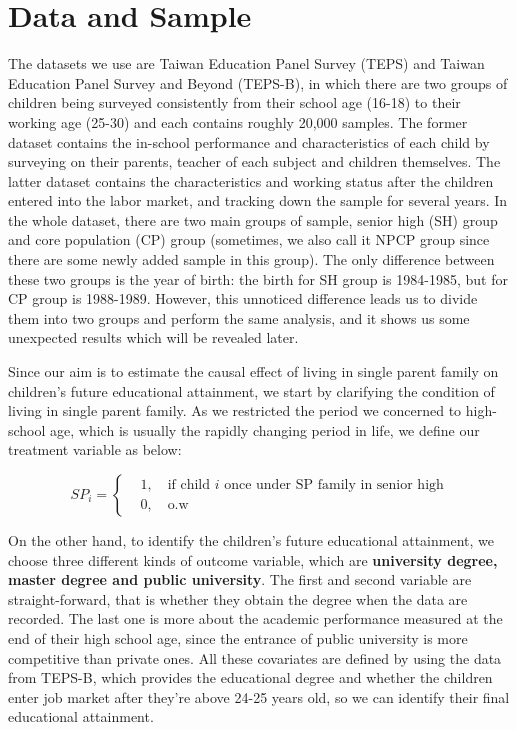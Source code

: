 \documentclass[]{AEA}
\begin{document}
\section{Data and Sample} %

    The datasets we use are Taiwan Education Panel Survey (TEPS) and Taiwan Education Panel Survey and Beyond (TEPS-B), in which there are two groups of children being surveyed consistently from their school age (16-18) to their working age (25-30) and each contains roughly 20,000 samples. The former dataset contains the in-school performance and characteristics of each child by surveying on their parents, teacher of each subject and children themselves. The latter dataset contains the characteristics and working status after the children entered into the labor market, and tracking down the sample for several years.  In the whole dataset, there are two main groups of sample, senior high (SH) group and core population (CP) group (sometimes, we also call it NPCP group since there are some newly added sample in this group).  The only difference between these two groups is the year of birth: the birth for SH group is 1984-1985, but for CP group is 1988-1989.  However, this unnoticed difference leads us to divide them into two groups and perform the same analysis, and it shows us some unexpected results which will be revealed later.

    Since our aim is to estimate the causal effect of living in single parent family on children's future educational attainment, we start by clarifying the condition of living in single parent family.  As we restricted the period we concerned to high-school age, which is usually the rapidly changing period in life, we define our treatment variable as below:

    \[
        \textit{SP}_i =
        \left\{\begin{aligned}
        &1,\quad\text{if child $i$ once under SP family in senior high} \\
        &0,\quad\text{o.w}
        \end{aligned}\right.
    \]

    On the other hand, to identify the children's future educational attainment, we choose three different kinds of outcome variable, which are \textbf{university degree, master degree and public university}.   The first and second variable are straight-forward, that is whether they obtain the degree when the data are recorded.  The last one is more about the academic performance measured at the end of their high school age, since the entrance of public university is more competitive than private ones.  All these covariates are defined by using the data from TEPS-B, which provides the educational degree and whether the children enter job market after they're above 24-25 years old, so we can identify their final educational attainment.  
    
\end{document}
